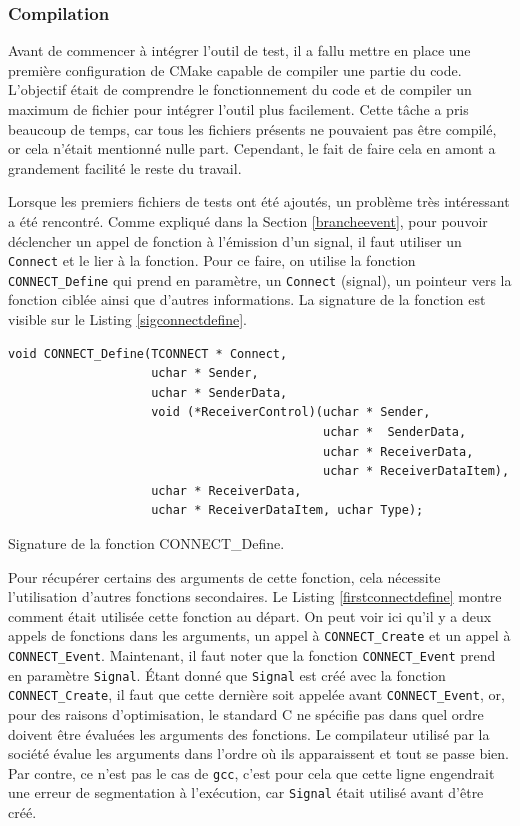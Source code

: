 \documentclass[a4paper]{article}
\begin{document}
\subsubsection*{Compilation}

Avant de commencer à intégrer l'outil de test, il a fallu mettre en place une
première configuration de CMake capable de compiler une partie du code.
L'objectif était de comprendre le fonctionnement du code et de compiler un
maximum de fichier pour intégrer l'outil plus facilement. Cette tâche a pris
beaucoup de temps, car tous les fichiers présents ne pouvaient pas être compilé,
or cela n'était mentionné nulle part. Cependant, le fait de faire cela en amont a
grandement facilité le reste du travail.

Lorsque les premiers fichiers de tests ont été ajoutés, un problème très
intéressant a été rencontré. Comme expliqué dans la Section \ref{brancheevent},
pour pouvoir déclencher un appel de fonction à l'émission d'un signal, il faut
utiliser un \verb|Connect| et le lier à la fonction. Pour ce faire, on utilise
la fonction \verb|CONNECT_Define| qui prend en paramètre, un \verb|Connect|
(signal), un pointeur vers la fonction ciblée ainsi que d'autres informations.
La signature de la fonction est visible sur le Listing \ref{sigconnectdefine}.

\begin{listing}[ht!]
\begin{verbatim}
void CONNECT_Define(TCONNECT * Connect,
                    uchar * Sender,
                    uchar * SenderData,
                    void (*ReceiverControl)(uchar * Sender,
                                            uchar *  SenderData,
                                            uchar * ReceiverData,
                                            uchar * ReceiverDataItem),
                    uchar * ReceiverData,
                    uchar * ReceiverDataItem, uchar Type);
\end{verbatim}
\caption{Signature de la fonction CONNECT\_Define.}
\label{sigconnectdefine}
\end{listing}

Pour récupérer certains des arguments de cette fonction, cela nécessite
l'utilisation d'autres fonctions secondaires. Le Listing
\ref{firstconnectdefine} montre comment était utilisée cette fonction au départ.
On peut voir ici qu'il y a deux appels de fonctions dans les arguments, un appel
à \verb|CONNECT_Create| et un appel à \verb|CONNECT_Event|. Maintenant, il faut
noter que la fonction \verb|CONNECT_Event| prend en paramètre \verb|Signal|.
Étant donné que \verb|Signal| est créé avec la fonction \verb|CONNECT_Create|,
il faut que cette dernière soit appelée avant \verb|CONNECT_Event|, or, pour des
raisons d'optimisation, le standard C ne spécifie pas dans quel ordre doivent
être évaluées les arguments des fonctions. Le compilateur utilisé par la société
évalue les arguments dans l'ordre où ils apparaissent et tout se passe bien. Par
contre, ce n'est pas le cas de \verb|gcc|, c'est pour cela que cette ligne
engendrait une erreur de segmentation à l'exécution, car \verb|Signal| était
utilisé avant d'être créé.
\end{document}
